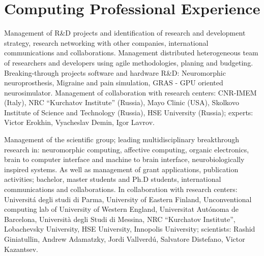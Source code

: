 \documentclass{moderncv}
\begin{document}




\section{Computing Professional Experience}

        {Management of R\&D projects and identification of research and development strategy, research networking with other companies, international communications and collaborations. Management distributed heterogeneous team of researchers and developers using agile methodologies, planing and budgeting.
          Breaking-through projects software and hardware R\&D: Neuromorphic neuroprosthesis, Migraine and pain simulation, GRAS - GPU oriented neurosimulator.
          Management of collaboration with research centers: CNR-IMEM (Italy), NRC ``Kurchatov Institute'' (Russia), Mayo Clinic (USA), Skolkovo Institute of Science and Technology (Russia), HSE University (Russia); experts: Victor Erokhin, Vyacheslav Demin, Igor Lavrov.}
        
        {Management of the scientific group; leading multidisciplinary breakthrough research in: neuromorphic computing, affective computing, organic electronics, brain to computer interface and machine to brain interface, neurobiologically inspired systems. As well as management of grant applications, publication activities; bachelor, master students and Ph.D students, international communications and collaborations.
          In collaboration with research centers: Universit\'{a} degli studi di Parma, University of Eastern Finland, Unconventional computing lab of University of Western England, Universitat Aut\'onoma de Barcelona, Università degli Studi di Messina,
NRC ``Kurchatov Institute'', Lobachevsky University, HSE University, Innopolis University; scientists: Rashid Giniatullin, Andrew Adamatzky, Jordi Vallverd\'{u}, Salvatore Distefano, Victor Kazantsev.}
\end{document}
